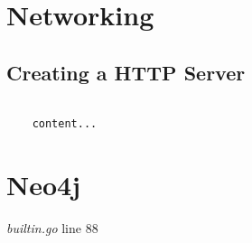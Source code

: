 \documentclass[]{article}
\renewcommand{\it}[1]{\textit{#1}}
\begin{document}
\section{Networking}

\subsection{Creating a HTTP Server}
\begin{lstlisting}

	content...
\end{lstlisting}



\section{Neo4j}

\begin{thebibliography}{99}
	
	\it{builtin.go} line 88
	
\end{thebibliography}
\end{document}
